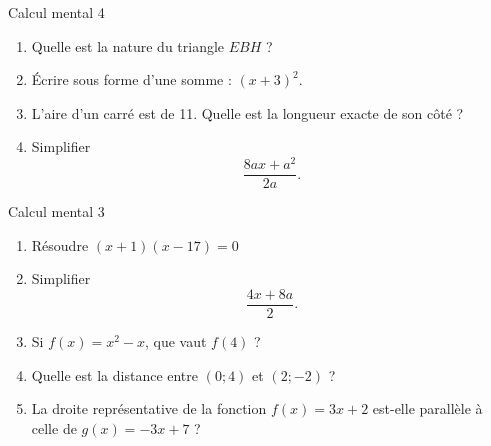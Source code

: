 \documentclass{beamer}
\begin{document}
\begin{frame}{Calcul mental 4}
    
    \begin{enumerate}
        \item

    \pause
            \begin{multicols}{2}

                Quelle est la nature du triangle \( EBH\) ?

                \columnbreak

                
            \end{multicols}

        \item
    \pause
            Écrire sous forme d'une somme : $(x+3)^2$.
        \item
            \pause
            L'aire d'un carré est de \unit{11}{\centi\meter\squared}. Quelle est la longueur exacte de son côté ?
        \item
            \pause
            Simplifier 
            \begin{equation}
                \frac{ 8ax+a^2 }{ 2a }.
            \end{equation}
            
    \end{enumerate}
\end{frame}


\begin{frame}{Calcul mental 3}
    \pause
    \begin{enumerate}
        \item
            Résoudre \( (x+1)(x-17)=0\)
            \pause
        \item
            Simplifier
            \begin{equation}
                \frac{ 4x+8a }{ 2 }.
            \end{equation}
            \pause
        \item
            Si \( f(x)=x^2-x\), que vaut \( f(4)\) ?
            \pause
        \item
            Quelle est la distance entre \( (0;4)\) et \( (2;-2)\) ?
            \pause
        \item
            La droite représentative de la fonction \( f(x)=3x+2\) est-elle parallèle à celle de \( g(x)=-3x+7\) ?
    \end{enumerate}
\end{frame}
\end{document}
